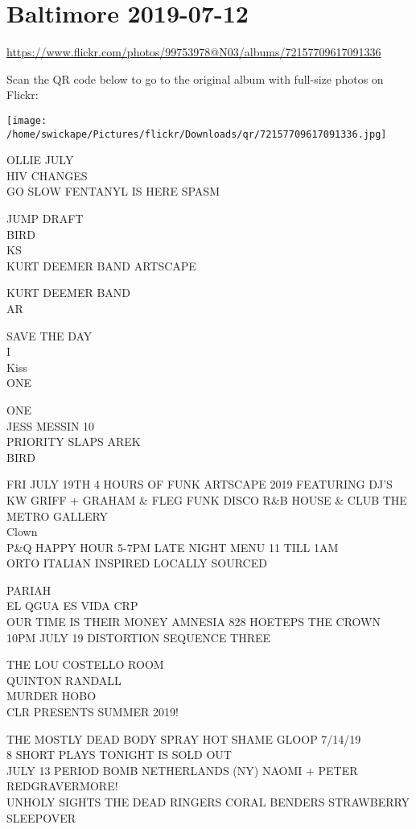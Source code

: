 \documentclass[10pt,letterpaper]{article}
\begin{document}
\section*{Baltimore 2019-07-12}

\url{https://www.flickr.com/photos/99753978@N03/albums/72157709617091336}

Scan the QR code below to go to the original album with full-size photos on Flickr:

\texttt{[image: /home/swickape/Pictures/flickr/Downloads/qr/72157709617091336.jpg]}


OLLIE JULY\\
HIV CHANGES\\
GO SLOW FENTANYL IS HERE SPASM

JUMP DRAFT\\
BIRD\\
KS\\
KURT DEEMER BAND ARTSCAPE

KURT DEEMER BAND\\
AR

SAVE THE DAY\\
I\\
Kiss\\
ONE

ONE\\
JESS MESSIN 10\\
PRIORITY SLAPS AREK\\
BIRD

FRI JULY 19TH 4 HOURS OF FUNK ARTSCAPE 2019 FEATURING DJ'S KW GRIFF + GRAHAM \& FLEG FUNK DISCO R\&B HOUSE \& CLUB THE METRO GALLERY\\
Clown\\
P\&Q HAPPY HOUR 5{-}7PM LATE NIGHT MENU 11 TILL 1AM\\
ORTO ITALIAN INSPIRED LOCALLY SOURCED

PARIAH\\
EL QGUA ES VIDA CRP\\
OUR TIME IS THEIR MONEY AMNESIA 828 HOETEPS THE CROWN 10PM JULY 19 DISTORTION SEQUENCE THREE

THE LOU COSTELLO ROOM\\
QUINTON RANDALL\\
MURDER HOBO\\
CLR PRESENTS SUMMER 2019!

THE MOSTLY DEAD BODY SPRAY HOT SHAME GLOOP 7/14/19\\
8 SHORT PLAYS TONIGHT IS SOLD OUT\\
JULY 13 PERIOD BOMB NETHERLANDS (NY) NAOMI + PETER REDGRAVERMORE!\\
UNHOLY SIGHTS THE DEAD RINGERS CORAL BENDERS STRAWBERRY SLEEPOVER
\end{document}
